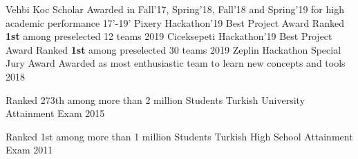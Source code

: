 


\begin{cvopenhonors}
  \cvhonor
    {Vehbi Koc Scholar } %
    {Awarded in Fall'17, Spring'18, Fall'18 and Spring'19 for high academic performance}
    {} %
    {17'-19'} %
  \cvhonor
    {Pixery Hackathon'19 Best Project Award} %
    {Ranked \textbf{1st} among preselected 12 teams} %
    {} %
    {2019} %
  \cvhonor
    {Ciceksepeti Hackathon'19 Best Project Award} %
    {Ranked \textbf{1st} among preselected 30 teams} %
    {} %
    {2019} %
  \cvhonor
    {Zeplin Hackathon Special Jury Award} %
    {Awarded as most enthusiastic team to learn new concepts and tools} %
    {} %
    {2018} %

  \cvhonor
    {Ranked 273th among more than 2 million Students} %
    {Turkish University Attainment Exam} %
    {} %
    {2015} %
    
  \cvhonor
    {Ranked 1st among more than 1 million Students} %
    {Turkish High School Attainment Exam} %
    {} %
    {2011} %

\end{cvopenhonors}

